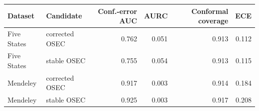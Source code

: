 \begin{tabular}{llrrrr}
\toprule
Dataset & Candidate & Conf.-error AUC & AURC & Conformal coverage & ECE \\
\midrule
Five States & corrected OSEC & 0.762 & 0.051 & 0.913 & 0.112 \\
Five States & stable OSEC & 0.755 & 0.054 & 0.913 & 0.115 \\
Mendeley & corrected OSEC & 0.917 & 0.003 & 0.914 & 0.184 \\
Mendeley & stable OSEC & 0.925 & 0.003 & 0.917 & 0.208 \\
\bottomrule
\end{tabular}
